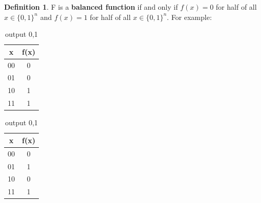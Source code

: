\documentclass[12pt]{article}
\theoremstyle{definition}
\newtheorem{definition}[theorem]{Definition}
\begin{document}
 \begin{definition}
 F is a \textbf{balanced function} if and only if $f(x) = 0$ for half of all $x\in\{0,1\}^n$ and $f(x) = 1$ for half of all $x\in\{0,1\}^n$. For example:
\begin{table}[H]
    \begin{minipage}{.5\linewidth}
      
      \centering
        \begin{tabular}{|c|c|}
           \hline
            x&f(x)\\
            \hline
            00 & 0  \\  
            01 & 0 \\
            10 & 1 \\
            11 & 1 \\
            \hline
        \end{tabular}
        \caption{output 0,1}
    \end{minipage}%
    \begin{minipage}{.5\linewidth}
      \centering
        
        \begin{tabular}{|c|c|}
         \hline
            x&f(x)\\
            \hline
            00 & 0  \\  
            01 & 1 \\
            10 & 0 \\
            11 & 1 \\
            \hline
        \end{tabular}
        \caption{output 0,1}
    \end{minipage} 
\end{table}
\end{definition}
\end{document}
